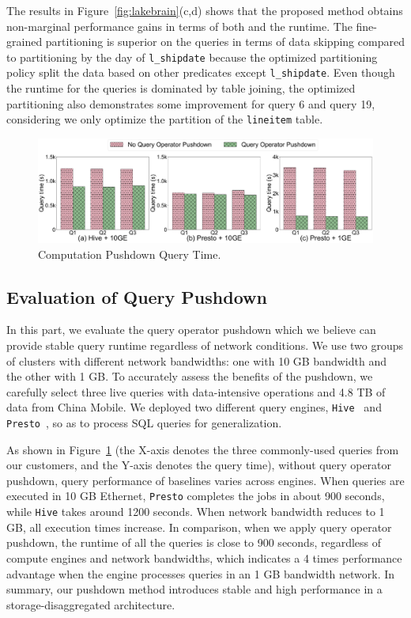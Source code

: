 The results  in Figure~\ref{fig:lakebrain}(c,d) shows that the proposed method obtains non-marginal performance gains in terms of both  and the runtime. The fine-grained partitioning is superior on the queries in terms of data skipping compared to partitioning by the day of \texttt{l\_shipdate} because the optimized partitioning policy split the data based on other predicates except \texttt{l\_shipdate}. Even though the runtime for the queries is dominated by table joining, the optimized partitioning also demonstrates some improvement for query 6 and query 19, considering we only optimize the partition of the \texttt{lineitem} table. 



\begin{figure}
	\centering
	\includegraphics[width=\columnwidth]{figures/Querytime}
	\vspace{-2em}
	\caption{Computation Pushdown Query Time.}
	\label{fig:pushdown}
	\vspace{-2.1em}
\end{figure}



\subsection{Evaluation of Query Pushdown}
In this part, we evaluate the query operator pushdown  which we believe can provide stable query runtime regardless of network conditions. 
We use two groups of clusters with different network bandwidths: one with 10 GB bandwidth and the other with 1 GB. To accurately assess the benefits of the pushdown, we carefully select three live queries with data-intensive operations and 4.8 TB of data from  China Mobile. We deployed two different query engines, \texttt{Hive}~\cite{hive} and \texttt{Presto}~\cite{presto}, so as to process  SQL queries for generalization.

As shown in Figure~\ref{fig:pushdown} (the X-axis denotes the three commonly-used queries from our customers, and the Y-axis denotes the query time), 
  without query operator pushdown, query performance of baselines varies  across engines. When  queries are executed in  10 GB Ethernet, \texttt{Presto} completes the jobs in about 900 seconds, while \texttt{Hive} takes around 1200 seconds. When network bandwidth reduces to 1 GB, all execution times increase.
 In comparison, when we apply query operator pushdown, the runtime of all the queries is close to 900 seconds, regardless of compute engines and network bandwidths, which indicates a 4 times performance advantage when the engine processes queries in an 1 GB bandwidth network.  In summary, our  pushdown method introduces stable and high performance  in a storage-disaggregated architecture. 



